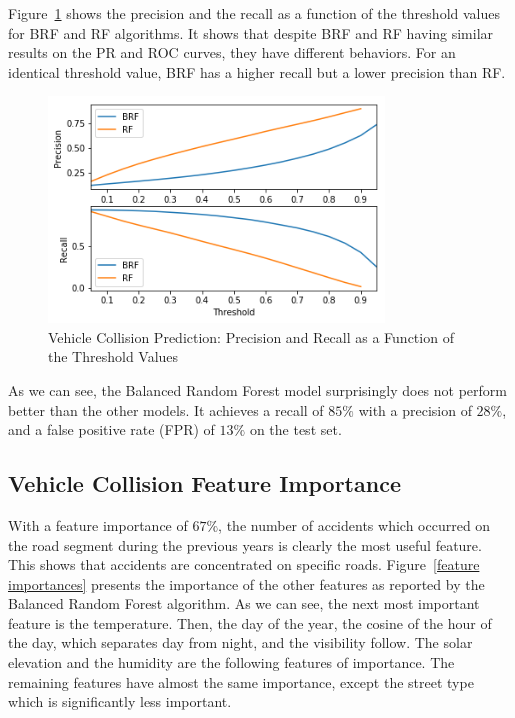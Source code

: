 \documentclass[conference]{IEEEtran}
\begin{document}
Figure~\ref{fig:pr-threshold} shows the precision and the recall as a function of the threshold values for BRF and RF algorithms.
It shows that despite BRF and RF having similar results on the PR and ROC curves, they have different behaviors. For an identical threshold value, BRF has a higher recall but a lower precision than RF.

\begin{figure}[htbp]
\centerline{\includegraphics[height=6cm, keepaspectratio]{Figures/pr_threshold.png}}
\caption{Vehicle Collision Prediction: Precision and Recall as a Function of the Threshold Values}
\label{fig:pr-threshold}
\end{figure}

As we can see, the Balanced Random Forest model surprisingly does not perform better than the other models.
It achieves a recall of $85\%$ with a precision of $28\%$, and a false positive rate (FPR) of $13\%$ on the test set.


\subsection{Vehicle Collision Feature Importance}

With a
feature importance of $67\%$, the number of accidents which occurred on the
road segment during the previous years is clearly the most useful feature. 
This shows that accidents are concentrated on specific roads.
Figure~\ref{feature importances} presents the
importance of the other features as reported by the Balanced Random Forest
algorithm. As we can see, the next most important feature is the temperature. 
Then, the day of the year, the cosine of the hour of the day, which separates day from night,
and the visibility follow. The solar elevation and the humidity are 
the following features of importance. The remaining features have almost
the same importance, except the street type which
is significantly less important.
\end{document}
